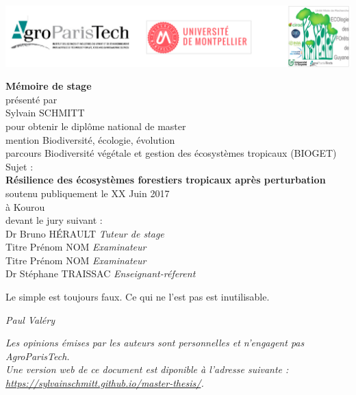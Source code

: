 \includegraphics{images/logos}

\begin{center}
  \LARGE{\textbf{Mémoire de stage}} \\
  \vspace*{\fill}
  \large{présenté par} \\
  \large{Sylvain SCHMITT} \\
  \vspace*{\fill}
  \large{pour obtenir le diplôme national de master} \\
  \large{mention Biodiversité, écologie, évolution} \\
  \small{parcours Biodiversité végétale et gestion des écosystèmes tropicaux (BIOGET)} \\
  \vspace*{\fill}
  \large{Sujet :} \\
  \Large{\textbf{Résilience des écosystèmes forestiers tropicaux après perturbation}} \\
  \vspace*{\fill}
  \large{soutenu publiquement le XX Juin 2017} \\
  \large{à Kourou} \\
  \vspace*{\fill}
  \large{devant le jury suivant :} \\
  \vspace*{\fill}
  Dr Bruno HÉRAULT  \emph{Tuteur de stage} \\
  Titre Prénom NOM  \emph{Examinateur} \\
  Titre Prénom NOM  \emph{Examinateur} \\
  Dr Stéphane TRAISSAC  \emph{Enseignant-réferent} \\
\end{center}

\newpage
\vspace*{\fill}
\epigraph{Le simple est toujours faux. Ce qui ne l'est pas est inutilisable.}{\textit{Paul Valéry}}
\vspace*{\fill}
\emph{Les opinions émises par les auteurs sont personnelles et n'engagent pas AgroParisTech.}\\
\emph{Une version web de ce document est diponible à l'adresse suivante : \url{https://sylvainschmitt.github.io/master-thesis/}.}
\newpage
